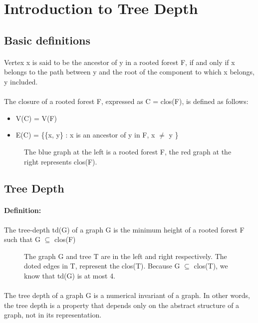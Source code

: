 \section{Introduction to Tree Depth}

\subsection{Basic definitions}

\paragraph{}
Vertex x is said to be the ancestor of y in a rooted forest F, if and only if x belongs to the path between y and the root of the component to which x belongs, y included.
\paragraph{}
The closure of a rooted forest F, expressed as C = clos(F), is defined as follows:
\begin{itemize}
  \item V(C) = V(F)
  \item E(C) = \{\{x, y\} : x is an ancestor of y in F, x $\neq$ y \}
\end{itemize}
\begin{figure}[h]

\caption{The blue graph at the left is a rooted forest F, the red graph at the right represents clos(F).}
\end{figure}

\subsection{Tree Depth}

\paragraph{Definition:}The tree-depth td(G) of a graph G is the minimum height of a rooted forest F such that G $\subseteq$ clos(F)

\begin{figure}[H]

\caption{The graph G and tree T are in the left and right respectively. The doted edges in T, represent the clos(T). Because G $\subseteq$ clos(T), we know that td(G) is at most 4.\label{fig:3d-cube}}
\end{figure}
\paragraph{}
The tree depth of a graph G is a numerical invariant of a graph. In other words, the tree depth is a property that depends only  on the abstract structure of a graph, not in its	 representation.	

